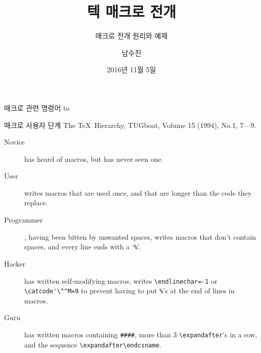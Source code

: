 \documentclass{beamer}
\title{텍 매크로 전개}
\subtitle{매크로 전개 원리와 예제}
\author{남수진}
\date{2016년 11월 5일}
\institute{
  2016 공주대학교 문서작성 워크숍 2016\\
  공주대학교 인문사회과학관 1층 컴퓨터실 107호}
\begin{document}
\maketitle


%
\begin{frame}{매크로 관련 명령어}
  \vspace{4mm}
  \hbox to
\end{frame}


%
\begin{frame}[fragile]{매크로 사용자 단계}
  The \TeX\ Hierarchy, TUGboat, Volume 15 (1994), No.1, 7---9.
  \begin{description}
  \item [Novice] has heard of macros, but has never seen one.
  \item [User] writes macros that are used once, and that are
    longer than the code they replace.
  \item [Programmer], having been bitten by unwanted spaces,
    writes macros that don't contain spaces, and every line ends with
    a `{\small\verb+%+}'.
  \item [Hacker] has written self-modifying macros, writes
    {\small\verb+\endlinechar=-1+} or {\small\verb+\catcode'\^^M=9+}
    to prevent having to put {\small\verb+%+}'s at the end of lines in macros.
  \item [Guru] has written macros containing {\small\verb+####+}, more than 3
    {\small\verb+\expandafter+}'s in a row, and the sequence
    {\small\verb+\expandafter\endcsname+}.
  \end{description}
\end{frame}
\end{document}
